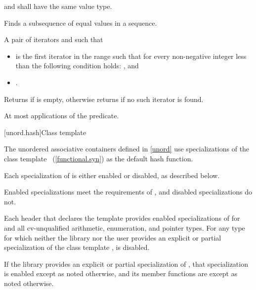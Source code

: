 \begin{itemdescr}
\pnum
\requires
{} and  shall have the same value type.

\pnum
\effects
Finds a subsequence of equal values in a sequence.

\pnum
\returns
A pair of iterators  and  such that
\begin{itemize}
\item {} is the first iterator  in the range
 such that
for every non-negative integer  less than 
the following condition holds:
, and
\item {}.
\end{itemize}
Returns  if  is empty,
otherwise returns  if no such iterator is found.

\pnum
\complexity
At most  applications of the predicate.
\end{itemdescr}

[unord.hash]{Class template }

\pnum
{}%
%
The unordered associative containers defined in \ref{unord} use
specializations of the class template ~(\ref{functional.syn})
as the default hash function.

\pnum
Each specialization of  is either enabled or disabled,
as described below.
\begin{note}
Enabled specializations meet the requirements of , and
disabled specializations do not.
\end{note}
Each header that declares the template 
provides enabled specializations of  for  and
all cv-unqualified arithmetic, enumeration, and pointer types.
For any type  for which neither the library nor the user provides
an explicit or partial specialization of the class template ,
 is disabled.

\pnum
If the library provides an explicit or partial specialization of ,
that specialization is enabled except as noted otherwise,
and its member functions are  except as noted otherwise.

